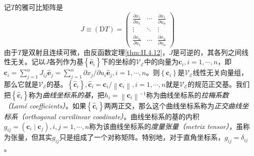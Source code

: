 \documentclass[../main.tex]{subfiles}
\begin{document}
记$T$的雅可比矩阵是
\[J\equiv\left(\mathrm{D}T\right)=\left(\begin{array}{ccc}
            \frac{\partial x_1}{\partial u_1} & \cdots & \frac{\partial x_1}{\partial u_n} \\
            \vdots                            & \ddots & \vdots                            \\
            \frac{\partial x_n}{\partial u_1} & \cdots & \frac{\partial x_n}{\partial u_n}
        \end{array}\right)\]
由于$T$是双射且连续可微，由反函数定理\ref{thm:II.4.12}，$J$是可逆的，其各列之间线性无关。记以$J$各列作为基$\left\{\mathbf{\hat{e}}_i\right\}$下的坐标的$\mathcal{V}_\mathcal{E}$中的向量为$\mathbf{c}_i,i=1,\cdots,n$，即$\mathbf{c}_i=\sum_{j=1}^n J_{ij}\mathbf{\hat{e}}_j=\sum_{j=1}^n\partial x_j/\partial u_i\mathbf{\hat{e}}_j,i=1,\cdots,n$。则$\left\{\mathbf{c}_i\right\}$是$\mathcal{V}_\mathcal{E}$线性无关向量组，那么它就是$\mathcal{V}_\mathcal{E}$的基。$\left\{\mathbf{\hat{c}}_i\right\},\mathbf{\hat{c}}_i=\mathbf{c}_i/\left\|\mathbf{c}_i\right\|,i=1,\cdots,n$就是$\mathcal{V}_\mathcal{E}$的规范正交基。我们把$\left\{\mathbf{\hat{c}}_i\right\}$称为\emph{曲线坐标系的基}，把$h_i=\left\|\mathbf{c}_i\right\|^{-1}$称为曲线坐标系的\emph{拉梅系数（Lam\'{e} coefficients）}。如果$\left\{\mathbf{\hat{c}}_i\right\}$两两正交，那么这个曲线坐标系称为\emph{正交曲线坐标系（orthogonal curvilinear coodinate）}。曲线坐标系的基的内积$g_{ij}=\left(\mathbf{c}_i\mid\mathbf{c}_j\right),i,j=1,\cdots,n$称为该曲线坐标系的\emph{度量张量（metrix tensor）}，虽称为张量，但其实$g_{ij}$只是组成了一个对称矩阵。特别地，对于直角坐标系，$g_{ij}=\delta_{ij}$。
\end{document}
